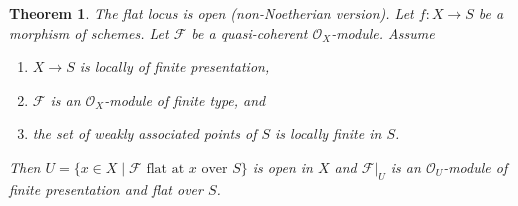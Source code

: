 \documentclass{amsart}
\newenvironment{slogan}{\comment}{\endcomment}
\theoremstyle{plain}
\newtheorem{theorem}[subsection]{Theorem}
\theoremstyle{definition}
\theoremstyle{remark}
\numberwithin{equation}{subsection}
\begin{document}
\begin{theorem}
\label{theorem-finite-type-flat}
\begin{slogan}
The flat locus is open (non-Noetherian version).
\end{slogan}
Let $f : X \to S$ be a morphism of schemes.
Let $\mathcal{F}$ be a quasi-coherent $\mathcal{O}_X$-module.
Assume
\begin{enumerate}
\item $X \to S$ is locally of finite presentation,
\item $\mathcal{F}$ is an $\mathcal{O}_X$-module of finite type, and
\item the set of weakly associated points of $S$ is locally finite in $S$.
\end{enumerate}
Then $U = \{x \in X \mid \mathcal{F}\text{ flat at }x\text{ over }S\}$
is open in $X$ and $\mathcal{F}|_U$ is an $\mathcal{O}_U$-module
of finite presentation and flat over $S$.
\end{theorem}
\end{document}
